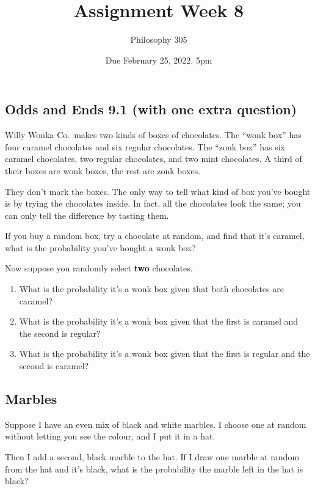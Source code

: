 \documentclass[
  11pt,
]{article}
\title{Assignment Week 8}
\author{Philosophy 305}
\date{Due February 25, 2022, 5pm}
\providecommand{\tightlist}{%
  \setlength{\itemsep}{0pt}\setlength{\parskip}{0pt}}
\begin{document}
\maketitle

\hypertarget{odds-and-ends-9.1-with-one-extra-question}{%
\subsection{Odds and Ends 9.1 (with one extra
question)}\label{odds-and-ends-9.1-with-one-extra-question}}

Willy Wonka Co.~makes two kinds of boxes of chocolates. The ``wonk box''
has four caramel chocolates and six regular chocolates. The ``zonk box''
has six caramel chocolates, two regular chocolates, and two mint
chocolates. A third of their boxes are wonk boxes, the rest are zonk
boxes.

They don't mark the boxes. The only way to tell what kind of box you've
bought is by trying the chocolates inside. In fact, all the chocolates
look the same; you can only tell the difference by tasting them.

If you buy a random box, try a chocolate at random, and find that it's
caramel, what is the probability you've bought a wonk box?

Now suppose you randomly select \textbf{two} chocolates.

\begin{enumerate}
\def\labelenumi{\alph{enumi}.}
\tightlist
\item
  What is the probability it's a wonk box given that both chocolates are
  caramel?
\item
  What is the probability it's a wonk box given that the first is
  caramel and the second is regular?
\item
  What is the probability it's a wonk box given that the first is
  regular and the second is caramel?
\end{enumerate}

\hypertarget{marbles}{%
\subsection{Marbles}\label{marbles}}

Suppose I have an even mix of black and white marbles. I choose one at
random without letting you see the colour, and I put it in a hat.

Then I add a second, black marble to the hat. If I draw one marble at
random from the hat and it's black, what is the probability the marble
left in the hat is black?
\end{document}
